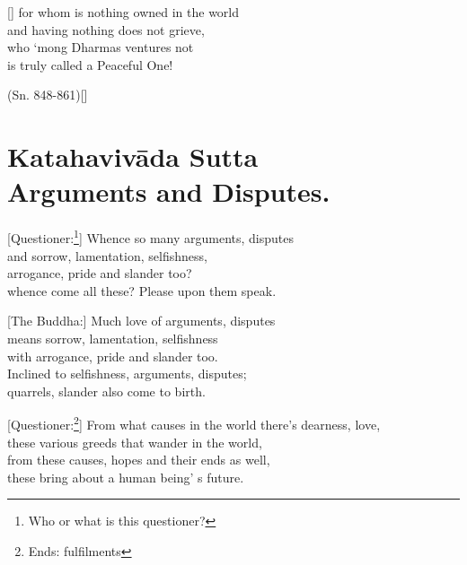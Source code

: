 \begin{MyDescription}{}[]
for whom is nothing owned in the world\\
and having nothing does not grieve,\\
who `mong Dharmas ventures not\\
is truly called a Peaceful One!
\end{MyDescription}

\begin{MyDescription}{(Sn. 848-861)}[]

\end{MyDescription}

\chapter{Katahaviv\=ada Sutta\\ Arguments and Disputes.}

\begin{MyDescription}{}[Questioner:\footnote{Who or what is this questioner?}]
Whence so many arguments, disputes\\
and sorrow, lamentation, selfishness,\\
arrogance, pride and slander too?\\
whence come all these? Please upon them speak.
\end{MyDescription}

\begin{MyDescription}{}[The Buddha:]
Much love of arguments, disputes\\
means sorrow, lamentation, selfishness\\
with arrogance, pride and slander too.\\
Inclined to selfishness, arguments, disputes;\\
quarrels, slander also come to birth.
\end{MyDescription}

\begin{MyDescription}{}[Questioner:\footnote{Ends: fulfilments}]
From what causes in the world there's dearness, love,\\
these various greeds that wander in the world,\\
from these causes, hopes and their ends as well,\\
these bring about a human being' s future.
\end{MyDescription}


